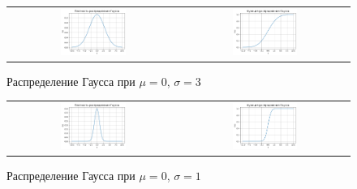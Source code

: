 \begin{figure}[H]
    \centering
    \begin{tabular}{cc}
        \includegraphics[width=0.4\textwidth]{img/gauss/density_0_3.png}
        &
        \includegraphics[width=0.4\textwidth]{img/gauss/function_0_3.png}
    \end{tabular}
    \caption{Распределение Гаусса при $\mu = 0$, $\sigma = 3$}
    \label{fig:}
\end{figure}

\begin{figure}[H]
    \centering
    \begin{tabular}{cc}
        \includegraphics[width=0.4\textwidth]{img/gauss/density_0_1.png}
        &
        \includegraphics[width=0.4\textwidth]{img/gauss/function_0_1.png}
    \end{tabular}
    \caption{Распределение Гаусса при $\mu = 0$, $\sigma = 1$}
    \label{fig:}
\end{figure}

